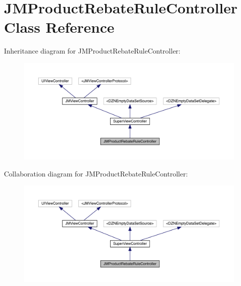 \hypertarget{interface_j_m_product_rebate_rule_controller}{}\section{J\+M\+Product\+Rebate\+Rule\+Controller Class Reference}
\label{interface_j_m_product_rebate_rule_controller}


Inheritance diagram for J\+M\+Product\+Rebate\+Rule\+Controller\+:\nopagebreak
\begin{figure}[H]
\begin{center}
\leavevmode
\includegraphics[width=350pt]{interface_j_m_product_rebate_rule_controller__inherit__graph}
\end{center}
\end{figure}


Collaboration diagram for J\+M\+Product\+Rebate\+Rule\+Controller\+:\nopagebreak
\begin{figure}[H]
\begin{center}
\leavevmode
\includegraphics[width=350pt]{interface_j_m_product_rebate_rule_controller__coll__graph}
\end{center}
\end{figure}

